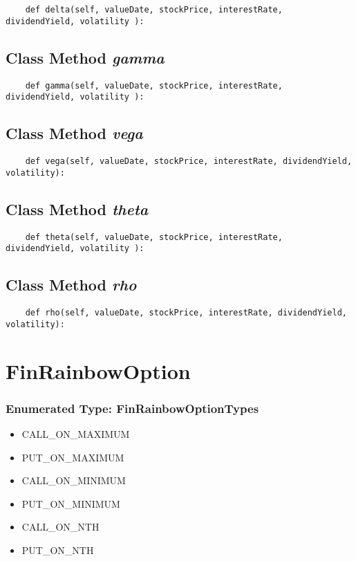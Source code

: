 \documentclass[twoside,11pt]{book}
\begin{document}
\begin{lstlisting}
    def delta(self, valueDate, stockPrice, interestRate, dividendYield, volatility ):
\end{lstlisting}

\subsection{Class Method {\it gamma}}


\begin{lstlisting}
    def gamma(self, valueDate, stockPrice, interestRate, dividendYield, volatility ):
\end{lstlisting}

\subsection{Class Method {\it vega}}


\begin{lstlisting}
    def vega(self, valueDate, stockPrice, interestRate, dividendYield, volatility):
\end{lstlisting}

\subsection{Class Method {\it theta}}


\begin{lstlisting}
    def theta(self, valueDate, stockPrice, interestRate, dividendYield, volatility ):
\end{lstlisting}

\subsection{Class Method {\it rho}}


\begin{lstlisting}
    def rho(self, valueDate, stockPrice, interestRate, dividendYield, volatility):
\end{lstlisting}

\newpage
\section{FinRainbowOption}

\subsubsection{Enumerated Type: FinRainbowOptionTypes}
\begin{itemize}
\item{CALL\_ON\_MAXIMUM}
\item{PUT\_ON\_MAXIMUM}
\item{CALL\_ON\_MINIMUM}
\item{PUT\_ON\_MINIMUM}
\item{CALL\_ON\_NTH}
\item{PUT\_ON\_NTH}
\end{itemize}
\end{document}
